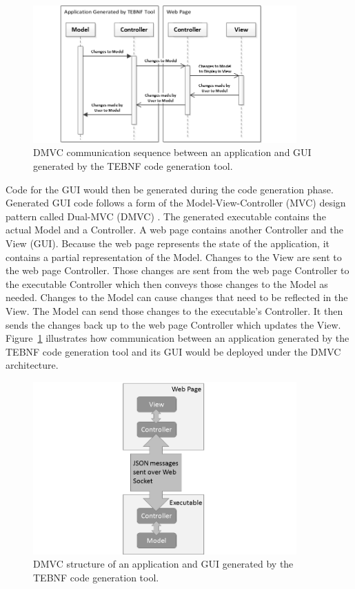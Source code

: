 \begin{figure}[h!]
\centering
\includegraphics[width=0.9\textwidth]{figures/DmvcCommSequence.png}
\caption{DMVC communication sequence between an application and GUI generated by the TEBNF code generation tool.}
\label{fig:DmvcCommSequence}
\end{figure}

\indent
Code for the GUI would then be generated during the code generation phase.  Generated GUI code follows a form of the Model-View-Controller (MVC) design pattern called Dual-MVC (DMVC) \cite{leff_01}.  The generated executable contains the actual Model and a Controller.  A web page contains another Controller and the View (GUI).  Because the web page represents the state of the application, it contains a partial representation of the Model.  Changes to the View are sent to the web page Controller.  Those changes are sent from the web page Controller to the executable Controller which then conveys those changes to the Model as needed.  Changes to the Model can cause changes that need to be reflected in the View.  The Model can send those changes to the executable’s Controller.  It then sends the changes back up to the web page Controller which updates the View.  Figure~\ref{fig:DmvcCommSequence} illustrates how communication between an application generated by the TEBNF code generation tool and its GUI would be deployed under the DMVC architecture.

\begin{figure}[h!]
\centering
\includegraphics[width=0.9\textwidth]{figures/DmvcStructure.png}
\caption{DMVC structure of an application and GUI generated by the TEBNF code generation tool.}
\label{fig:DmvcStructure}
\end{figure}

